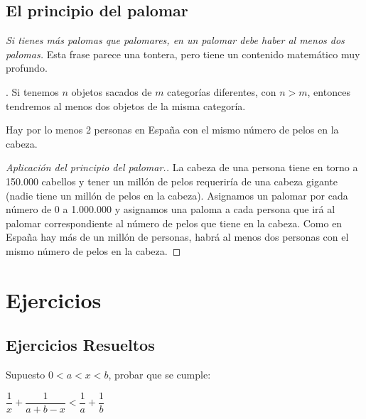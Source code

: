 		
		\subsection{El principio del palomar}
		
		\emph{Si tienes más palomas que palomares, en un palomar debe haber al menos dos palomas.} Esta frase parece una tontera, pero tiene un contenido matemático muy profundo.
		
		\begin{axio}. Si tenemos $n$ objetos sacados de $m$ categorías diferentes, con $n>m$, entonces tendremos al menos dos objetos de la misma categoría.
		\end{axio}
		
		\begin{ejem}
			Hay por lo menos 2 personas en España con el mismo número de pelos en la cabeza.
		\end{ejem}
		\begin{proof}[Aplicación del principio del palomar.]
			
		La cabeza de una persona tiene en torno a 150.000 cabellos y tener un millón de pelos requeriría de una cabeza gigante (nadie tiene un millón de pelos en la cabeza). Asignamos un palomar por cada número de 0 a 1.000.000 y asignamos una paloma a cada persona que irá al palomar correspondiente al número de pelos que tiene en la cabeza. Como en España hay más de un millón de personas, habrá al menos dos personas con el mismo número de pelos en la cabeza.  %
		\end{proof}
				
		
		\section{Ejercicios} \label{preliminares-ejercicios}
		
		\subsection{Ejercicios Resueltos}
		
		
		\begin{ejre}
			Supuesto $0<a<x<b$, probar que se cumple: 
			
			$\dfrac 1 x +\dfrac 1 {a+b-x} < \dfrac 1 a + \dfrac 1 b$
		\end{ejre}
		
